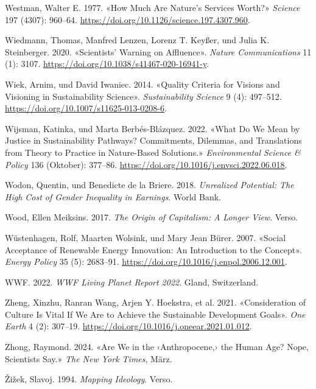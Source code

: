 \documentclass[
  nswissgerman,
  a4paper,
  DIV=11,
  numbers=noendperiod,
  oneside,
  openany]{scrreprt}
\newlength{\cslhangindent}
\newenvironment{CSLReferences}[2] %
 {\begin{list}{}{%
  \setlength{\itemindent}{0pt}
  \setlength{\leftmargin}{0pt}
  \setlength{\parsep}{0pt}
  \ifodd #1
   \setlength{\leftmargin}{\cslhangindent}
   \setlength{\itemindent}{-1\cslhangindent}
  \fi
  \setlength{\itemsep}{#2\baselineskip}}}
 {\end{list}}
\begin{document}
\begin{CSLReferences}{1}{1}
Westman, Walter E. 1977. {«How {Much Are Nature}'s {Services Worth}?»}
\emph{Science} 197 (4307): 960--64.
\url{https://doi.org/10.1126/science.197.4307.960}.

Wiedmann, Thomas, Manfred Lenzen, Lorenz T. Keyßer, und Julia K.
Steinberger. 2020. {«Scientists' Warning on Affluence»}. \emph{Nature
Communications} 11 (1): 3107.
\url{https://doi.org/10.1038/s41467-020-16941-y}.

Wiek, Arnim, und David Iwaniec. 2014. {«Quality Criteria for Visions and
Visioning in Sustainability Science»}. \emph{Sustainability Science} 9
(4): 497--512. \url{https://doi.org/10.1007/s11625-013-0208-6}.

Wijsman, Katinka, und Marta Berbés-Blázquez. 2022. {«What Do We Mean by
Justice in Sustainability Pathways? {Commitments}, Dilemmas, and
Translations from Theory to Practice in Nature-Based Solutions.»}
\emph{Environmental Science \& Policy} 136 (Oktober): 377--86.
\url{https://doi.org/10.1016/j.envsci.2022.06.018}.

{Wodon, Quentin, und Benedicte de la Briere}. 2018. \emph{Unrealized
Potential: {The} High Cost of Gender Inequality in Earnings}. World
Bank.

Wood, Ellen Meiksins. 2017. \emph{The Origin of Capitalism: A Longer
View}. Verso.

Wüstenhagen, Rolf, Maarten Wolsink, und Mary Jean Bürer. 2007. {«Social
Acceptance of Renewable Energy Innovation: {An} Introduction to the
Concept»}. \emph{Energy Policy} 35 (5): 2683--91.
\url{https://doi.org/10.1016/j.enpol.2006.12.001}.

WWF. 2022. \emph{{WWF Living Planet Report} 2022}. Gland, Switzerland.

Zheng, Xinzhu, Ranran Wang, Arjen Y. Hoekstra, et al. 2021.
{«Consideration of Culture Is Vital If We Are to Achieve the
{Sustainable Development Goals}»}. \emph{One Earth} 4 (2): 307--19.
\url{https://doi.org/10.1016/j.oneear.2021.01.012}.

Zhong, Raymond. 2024. {«Are {We} in the {‹{Anthropocene},›} the {Human
Age}? {Nope}, {Scientists Say}.»} \emph{The New York Times}, März.

Žižek, Slavoj. 1994. \emph{Mapping {Ideology}}. Verso.

\end{CSLReferences}
\end{document}
